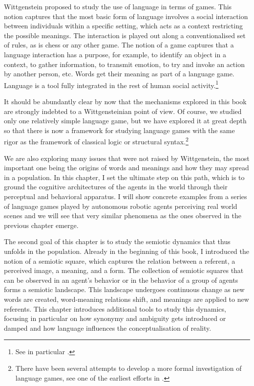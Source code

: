Wittgenstein proposed to study the use of language in terms of 
games. This notion captures that the most basic form of
language involves a social interaction between individuals
within a specific setting, which acts as a context restricting
the possible meanings. The interaction is played out 
along a conventionalised set of rules, as is chess or any
other game. The notion of a game captures
that a language interaction has a purpose, for example,
to identify an object in a context, to gather 
information, to transmit emotion, to try and
invoke an action by another person, etc. Words get 
their meaning as part of a language game. Language is a tool 
fully integrated in the rest of human social activity.\footnote{See in particular \cite{Wittgenstein:1953}.}

It should be abundantly clear by now that the mechanisms explored
in this book are strongly indebted to a Wittgensteinian 
point of view. Of course, we studied only one relatively 
simple language game, but we have explored it at
great depth so that there is now a framework for
studying language games with the same rigor as 
the framework of classical logic or structural syntax.\footnote{There have been several attempts to develop a 
more formal investigation of language games, see one of the 
earliest efforts in \cite{Hintikka:1998}.}

We are also exploring many issues that were not raised
by Wittgenstein, the most important one being the origins 
of words and meanings and how they may spread in 
a population. In this chapter, I set the ultimate 
step on this path, which is 
to ground the cognitive architectures of the agents
in the world through their perceptual and behavioral
apparatus. I will show concrete examples from a
series of language games played by autonomous 
robotic agents perceiving real world scenes
and we will see that very similar
phenomena as the ones observed in the previous chapter
emerge. 

The second goal of this chapter is to study the semiotic
dynamics that thus unfolds in the population. 
Already in the beginning of this book, I introduced the 
notion of a semiotic square, which captures the relation
between a referent, a perceived image, 
a meaning, and a form. The collection 
of semiotic squares that can be observed in an agent's
behavior or in the behavior of a group of agents
forms a semiotic landscape. This landscape undergoes
continuous change as new words are created, word-meaning relations
shift, and meanings are applied to new referents. 
This chapter introduces additional tools to study this dynamics, 
focusing in particular on how synonymy and ambiguity gets
introduced or damped and how language influences the 
conceptualisation of reality. 

